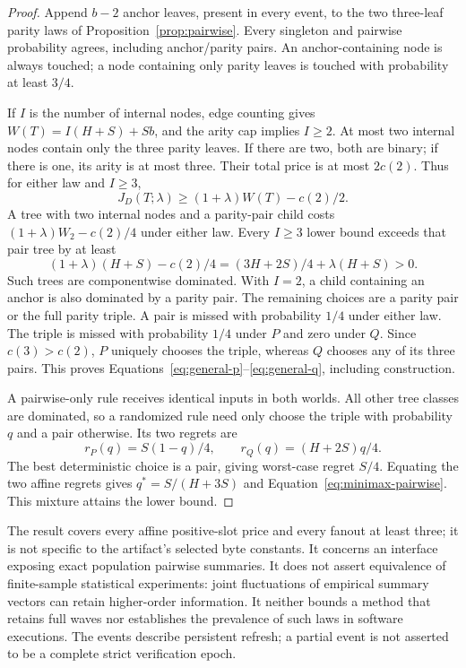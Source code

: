 \documentclass[10pt,journal,compsoc]{IEEEtran}
\theoremstyle{definition}\newtheorem{definition}[theorem]{Definition}
\begin{document}
\begin{proof}
Append $b-2$ anchor leaves, present in every event, to the two three-leaf
parity laws of Proposition~\ref{prop:pairwise}. Every singleton and pairwise
probability agrees, including anchor/parity pairs. An anchor-containing
node is always touched; a node containing only parity leaves is touched
with probability at least $3/4$.

If $I$ is the number of internal nodes, edge counting gives
$W(T)=I(H+S)+Sb$, and the arity cap implies $I\ge2$.
At most two internal nodes contain only the three parity leaves. If there
are two, both are binary; if there is one, its arity is at most three.
Their total price is at most $2c(2)$. Thus for either law and $I\ge3$,
\[
 J_D(T;\lambda)\ge(1+\lambda)W(T)-c(2)/2.
\]
A tree with two internal nodes and a parity-pair child costs
$(1+\lambda)W_2-c(2)/4$ under either law. Every $I\ge3$ lower bound exceeds
that pair tree by at least
\[
 (1+\lambda)(H+S)-c(2)/4
 = (3H+2S)/4+\lambda(H+S)>0.
\]
Such trees are componentwise dominated. With $I=2$, a child containing an
anchor is also dominated by a parity pair. The remaining choices are a
parity pair or the full parity triple. A pair is missed with probability
$1/4$ under either law. The triple is missed with probability $1/4$ under
$P$ and zero under $Q$. Since $c(3)>c(2)$, $P$ uniquely chooses the triple,
whereas $Q$ chooses any of its three pairs. This proves
Equations~\eqref{eq:general-p}--\eqref{eq:general-q}, including construction.

A pairwise-only rule receives identical inputs in both worlds. All other
tree classes are dominated, so a randomized rule need only choose the triple
with probability $q$ and a pair otherwise. Its two regrets are
\[
 r_P(q)=S(1-q)/4,\qquad r_Q(q)=(H+2S)q/4.
\]
The best deterministic choice is a pair, giving worst-case regret $S/4$.
Equating the two affine regrets gives $q^*=S/(H+3S)$ and
Equation~\eqref{eq:minimax-pairwise}. This mixture attains the lower bound.
\end{proof}

The result covers every affine positive-slot price and every fanout at least
three; it is not specific to the artifact's selected byte constants. It
concerns an interface exposing exact population pairwise summaries.
It does not assert equivalence of finite-sample statistical experiments:
joint fluctuations of empirical summary vectors can retain higher-order
information. It neither bounds a method
that retains full waves nor establishes the prevalence of such laws in
software executions. The events describe persistent refresh; a partial
event is not asserted to be a complete strict verification epoch.
\end{document}
